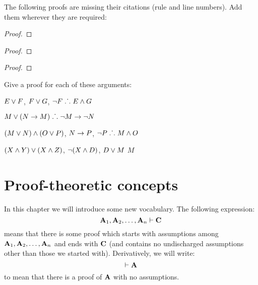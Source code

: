 \practiceproblems
\solutions
\problempart
\label{pr.justifyTFLproof}
The following proofs are missing their citations (rule and line numbers). Add them wherever they are required:
\begin{multicols}{2}
\begin{proof}
 {}
 {}
\end{proof}
\vfill
\begin{proof}
\open
\close
{}
\end{proof}
\columnbreak
\begin{proof}
\open
	 {}
		\open
	\close
\close
{}
\end{proof}
\end{multicols}

\problempart 
Give a proof for each of these arguments:
\begin{earg}
\item $E\vee F$, $F\vee G$, $\neg F \mathrel{\ldotp\dot{}\,\ldotp} E \wedge G$
\item $M\vee(N\rightarrow M) \mathrel{\ldotp\dot{}\,\ldotp} \neg M \rightarrow \neg N$
\item $(M \vee N) \wedge (O \vee P)$, $N \rightarrow P$, $\neg P \mathrel{\ldotp\dot{}\,\ldotp} M\wedge O$
\item $(X\wedge Y)\vee(X\wedge Z)$, $\neg(X\wedge D)$, $D\vee M$ \therefore $M$
\end{earg}



\chapter{Proof-theoretic concepts}\label{s:ProofTheoreticConcepts}

In this chapter we will introduce some new vocabulary. The following expression:
$$\mathbf{A}_1, \mathbf{A}_2, \ldots, \mathbf{A}_n \vdash \mathbf{C}$$
means that there is some proof which starts with assumptions among $\mathbf{A}_1, \mathbf{A}_2, \ldots, \mathbf{A}_n$ and ends with $\mathbf{C}$ (and contains no undischarged assumptions other than those we started with). Derivatively, we will write:
$$\vdash \mathbf{A}$$
to mean that there is a proof of $\mathbf{A}$ with no assumptions. 

